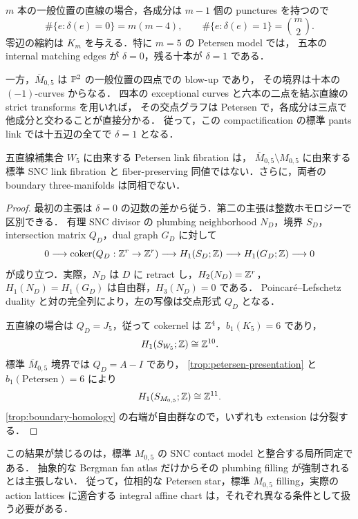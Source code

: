 $m$ 本の一般位置の直線の場合，各成分は $m-1$ 個の punctures を持つので
\[
 \#\{e:\delta(e)=0\}=m(m-4),\qquad
 \#\{e:\delta(e)=1\}=\binom m2.
\]
零辺の縮約は $K_m$ を与える．特に $m=5$ の Petersen model では，
五本の internal matching edges が $\delta=0$，残る十本が $\delta=1$ である．

一方，$\overline M_{0,5}$ は $\mathbb P^2$ の一般位置の四点での blow-up であり，
その境界は十本の $(-1)$-curves からなる\cite[Theorem 4.3.3]{KapranovChow}．
四本の exceptional curves と六本の二点を結ぶ直線の strict transforms を用いれば，
その交点グラフは Petersen で，各成分は三点で他成分と交わることが直接分かる．
従って，この compactification の標準 pants link では十五辺の全てで $\delta=1$ となる．

\begin{corollary}\label{trop:not-standard-M05}
五直線補集合 $W_5$ に由来する Petersen link fibration は，
$\overline M_{0,5}\setminus M_{0,5}$ に由来する標準 SNC link fibration と
fiber-preserving 同値ではない．さらに，両者の boundary three-manifolds は同相でない．
\end{corollary}

\begin{proof}
最初の主張は $\delta=0$ の辺数の差から従う．第二の主張は整数ホモロジーで区別できる．
有理 SNC divisor の plumbing neighborhood $N_D$，境界 $S_D$，
intersection matrix $Q_D$，dual graph $G_D$ に対して
\begin{equation}\label{trop:boundary-homology}
 0\longrightarrow\operatorname{coker}(Q_D:\mathbb Z^r\to\mathbb Z^r)
 \longrightarrow H_1(S_D;\mathbb Z)
 \longrightarrow H_1(G_D;\mathbb Z)\longrightarrow0
\end{equation}
が成り立つ．実際，$N_D$ は $D$ に retract し，$H_2(N_D)=\mathbb Z^r$，
$H_1(N_D)=H_1(G_D)$ は自由群，$H_3(N_D)=0$ である．
Poincar\'e--Lefschetz duality と対の完全列により，左の写像は交点形式 $Q_D$ となる．

五直線の場合は $Q_D=J_5$，従って cokernel は $\mathbb Z^4$，$b_1(K_5)=6$ であり，
\[
 H_1(S_{W_5};\mathbb Z)\cong\mathbb Z^{10}.
\]
標準 $\overline M_{0,5}$ 境界では $Q_D=A-I$ であり，
\eqref{trop:petersen-presentation} と $b_1(\text{Petersen})=6$ により
\[
 H_1(S_{M_{0,5}};\mathbb Z)\cong\mathbb Z^{11}.
\]
\eqref{trop:boundary-homology} の右端が自由群なので，いずれも extension は分裂する．
\end{proof}

\begin{remark}\label{trop:standard-model-scope}
この結果が禁じるのは，標準 $M_{0,5}$ の SNC contact model と整合する局所同定である．
抽象的な Bergman fan atlas だけからその plumbing filling が強制されるとは主張しない．
従って，位相的な Petersen star，標準 $M_{0,5}$ filling，実際の action lattices に適合する
integral affine chart は，それぞれ異なる条件として扱う必要がある．
\end{remark}

